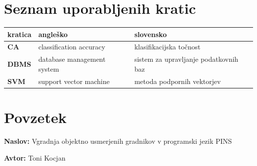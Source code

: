 \documentclass[a4paper, 12pt]{book}
\newcommand{\ttitle}{Vgradnja objektno usmerjenih gradnikov v programski jezik PINS}
\newcommand{\tauthor}{Toni Kocjan}
\newcommand{\clearemptydoublepage}{\newpage{\pagestyle{empty}\cleardoublepage}}
\begin{document}
\chapter*{Seznam uporabljenih kratic}  %

\noindent\begin{tabular}{p{}|p{}|p{}}    %
  {\bf kratica} & {\bf angleško}                             & {\bf slovensko} \\ \hline
  {\bf CA}      & classification accuracy               & klasifikacijska točnost \\
  {\bf DBMS} & database management system & sistem za upravljanje podatkovnih baz \\
  {\bf SVM}   & support vector machine              & metoda podpornih vektorjev \\
\end{tabular}


\clearemptydoublepage

\chapter*{Povzetek}

\noindent\textbf{Naslov:} \ttitle
\bigskip

\noindent\textbf{Avtor:} \tauthor
\bigskip
\end{document}
